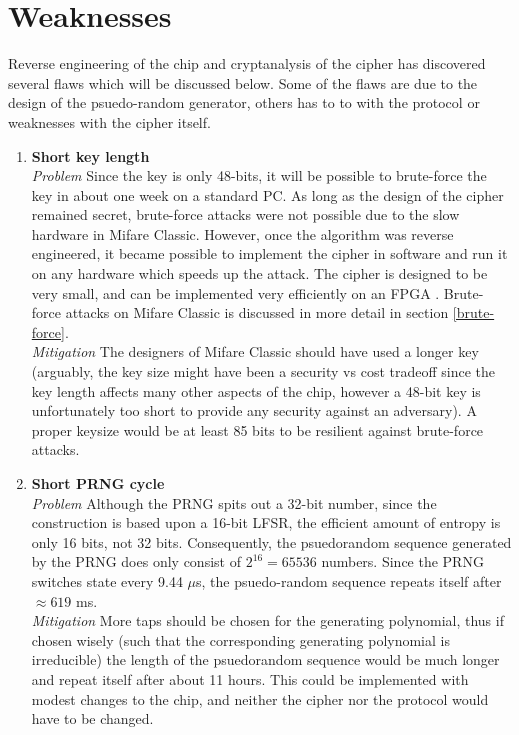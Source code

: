 \documentclass[10pt,twocolumn]{article}
\begin{document}
\section{Weaknesses}
\label{flaws}
Reverse engineering of the chip and cryptanalysis of the cipher has discovered several flaws which will be discussed below. Some of the flaws are due to the design of the psuedo-random generator, others has to to with the protocol or weaknesses with the cipher itself. 
\begin{enumerate}
    \item \textbf{Short key length}\\
    \textit{Problem} Since the key is only 48-bits, it will be possible to brute-force the key in about one week on a standard PC. As long as the design of the cipher remained secret, brute-force attacks were not possible due to the slow hardware in Mifare Classic. However, once the algorithm was reverse engineered, it became possible to implement the cipher in software and run it on any hardware which speeds up the attack. The cipher is designed to be very small, and can be implemented very efficiently on an FPGA \cite{nohl08_yt}. Brute-force attacks on Mifare Classic is discussed in more detail in section \ref{brute-force}.\\
    \textit{Mitigation} The designers of Mifare Classic should have used a longer key (arguably, the key size might have been a security vs cost tradeoff since the key length affects many other aspects of the chip, however a 48-bit key is unfortunately too short to provide any security against an adversary). A proper keysize would be at least 85 bits to be resilient against brute-force attacks.
    \item \textbf{Short PRNG cycle}\\
    \textit{Problem} Although the PRNG spits out a 32-bit number, since the construction is based upon a 16-bit LFSR, the efficient amount of entropy is only 16 bits, not 32 bits. Consequently, the psuedorandom sequence generated by the PRNG does only consist of $2^{16}=65536$ numbers. Since the PRNG switches state every 9.44 $\mu$s, the psuedo-random sequence repeats itself after $\approx619$ ms.\\
    \textit{Mitigation} More taps should be chosen for the generating polynomial, thus if chosen wisely (such that the corresponding generating polynomial is irreducible) the length of the psuedorandom sequence would be much longer and repeat itself after about 11 hours. This could be implemented with modest changes to the chip, and neither the cipher nor the protocol would have to be changed.

\end{enumerate}
\end{document}
